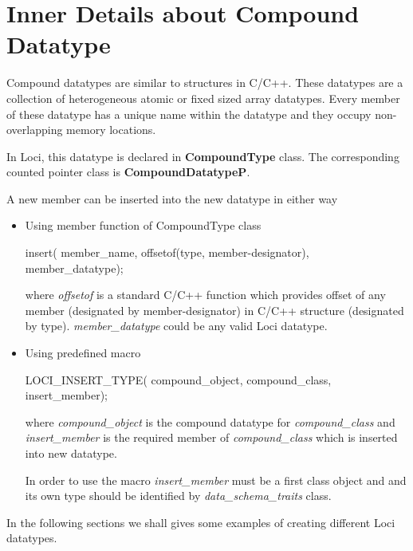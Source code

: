 \section{Inner Details about Compound Datatype}
Compound datatypes are similar to structures in C/C++. These datatypes
are a collection of heterogeneous atomic or fixed sized array datatypes. 
Every member of these datatype has a unique name within the datatype and 
they occupy  non-overlapping memory locations.
%
%
\par In Loci, this datatype is declared in {\bf CompoundType}
class. The corresponding counted pointer class is {\bf
CompoundDatatypeP}.
%
\par A new member can be inserted into the new datatype in either way
\begin{itemize}
\item Using member function of CompoundType class
\begin{center}
insert( member\_name, offsetof(type, member-designator), member\_datatype);
\end{center}
where {\em offsetof} is a standard C/C++ function which provides offset of any
member (designated by member-designator) in C/C++ structure (designated by type).
{\em member\_datatype} could be any valid Loci datatype.
%
\item Using predefined macro
\begin{center}
LOCI\_INSERT\_TYPE( compound\_object, compound\_class, insert\_member);
\end{center}
\par where {\em compound\_object} is the compound datatype for {\em compound\_class}
and {\em insert\_member} is the required member of {\em compound\_class} which
is inserted into new datatype. 
\par In order to use the macro {\em insert\_member} must be a first class object
and and its own type should be identified by {\em data\_schema\_traits} class.
\end{itemize}
\par In the following sections we shall gives some examples of
creating different Loci datatypes.
%
